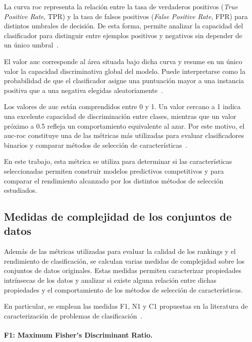 La curva \acrshort{roc} representa la relación entre la tasa de verdaderos positivos (\textit{True Positive Rate}, TPR) y la tasa de falsos positivos (\textit{False Positive Rate}, FPR) para distintos umbrales de decisión. De esta forma, permite analizar la capacidad del clasificador para distinguir entre ejemplos positivos y negativos sin depender de un único umbral~\cite{fawcett2006introduction}.

El valor \acrshort{auc} corresponde al área situada bajo dicha curva y resume en un único valor la capacidad discriminativa global del modelo. Puede interpretarse como la probabilidad de que el clasificador asigne una puntuación mayor a una instancia positiva que a una negativa elegidas aleatoriamente~\cite{hanley1982meaning}.

Los valores de \acrshort{auc} están comprendidos entre 0 y 1. Un valor cercano a 1 indica una excelente capacidad de discriminación entre clases, mientras que un valor próximo a 0.5 refleja un comportamiento equivalente al azar. Por este motivo, el \acrshort{auc}-\acrshort{roc} constituye una de las métricas más utilizadas para evaluar clasificadores binarios y comparar métodos de selección de características~\cite{bradley1997use,fawcett2006introduction}.

En este trabajo, esta métrica se utiliza para determinar si las características seleccionadas permiten construir modelos predictivos competitivos y para comparar el rendimiento alcanzado por los distintos métodos de selección estudiados.

\subsection{Medidas de complejidad de los conjuntos de datos}
\label{subsec:complejidad}

Además de las métricas utilizadas para evaluar la calidad de los rankings y el rendimiento de clasificación, se calculan varias medidas de complejidad sobre los conjuntos de datos originales. Estas medidas permiten caracterizar propiedades intrínsecas de los datos y analizar si existe alguna relación entre dichas propiedades y el comportamiento de los métodos de selección de características.

En particular, se emplean las medidas F1, N1 y C1 propuestas en la literatura de caracterización de problemas de clasificación~\cite{ho2002complexity,lorena2019complex}.

\paragraph{F1: Maximum Fisher's Discriminant Ratio.}

